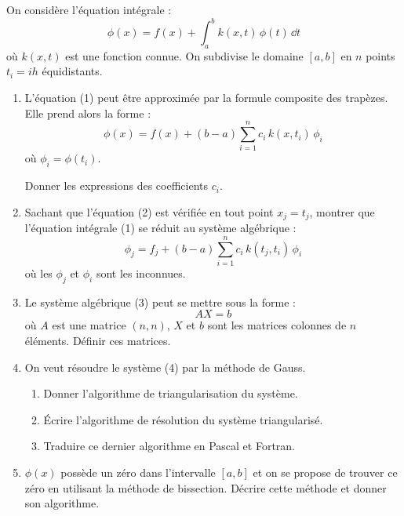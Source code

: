 On considère l'équation intégrale :
\begin{equation}
  \phi(x) = f(x) + \int_a^b k(x,t)\,\phi(t)\,\dd t
  \tag{1}
\end{equation}
où $k(x,t)$ est une fonction connue. On subdivise le domaine $[a,b]$ en $n$
points $t_i = ih$ équidistants.
\begin{enumerate}[label=\arabic*)-]
  \item L'équation (1) peut être approximée par la formule composite des
        trapèzes. Elle prend alors la forme :
        \begin{equation}
          \phi(x) = f(x) + (b - a)\sum_{i=1}^{n} c_i\,k(x, t_i)\,\phi_i
          \tag{2}
        \end{equation}
        où $\phi_i = \phi(t_i)$.

        Donner les expressions des coefficients $c_i$.
  \item Sachant que l'équation (2) est vérifiée en tout point $x_j = t_j$,
        montrer que l'équation intégrale (1) se réduit au système
        algébrique :
        \begin{equation}
          \phi_j = f_j + (b - a)\sum_{i=1}^{n} c_i\,k(t_j, t_i)\,\phi_i
          \tag{3}
        \end{equation}
        où les $\phi_j$ et $\phi_i$ sont les inconnues.
  \item Le système algébrique (3) peut se mettre sous la forme :
        \begin{equation}
          AX = b
          \tag{4}
        \end{equation}
        où $A$ est une matrice $(n,n)$, $X$ et $b$ sont les matrices colonnes
        de $n$ éléments. Définir ces matrices.
  \item On veut résoudre le système (4) par la méthode de Gauss.
        \begin{enumerate}[label=\alph*)-]
          \item Donner l'algorithme de triangularisation du système.
          \item Écrire l'algorithme de résolution du système triangularisé.
          \item Traduire ce dernier algorithme en Pascal et Fortran.
        \end{enumerate}
  \item $\phi(x)$ possède un zéro dans l'intervalle $[a,b]$ et on se propose
        de trouver ce zéro en utilisant la méthode de bissection. Décrire
        cette méthode et donner son algorithme.
\end{enumerate}

